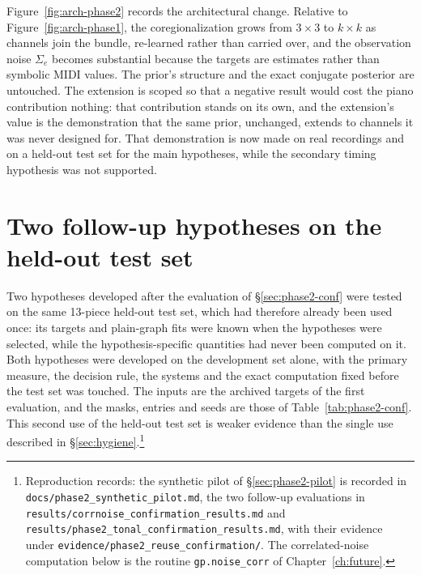 Figure~\ref{fig:arch-phase2} records the architectural change. Relative
to Figure~\ref{fig:arch-phase1}, the coregionalization grows from
$3 \times 3$ to $k \times k$ as channels join the bundle, re-learned
rather than carried over, and the observation noise $\Sigma_e$ becomes
substantial because the targets are estimates rather than symbolic MIDI
values. The prior's structure and the exact conjugate posterior are
untouched. The extension is scoped so that a negative result would cost
the piano contribution nothing: that contribution stands on its own, and
the extension's value is the demonstration that the same prior,
unchanged, extends to channels it was never designed for. That
demonstration is now made on real recordings and on a held-out test set
for the main hypotheses, while the secondary timing hypothesis was not
supported.


\section{Two follow-up hypotheses on the held-out test set}
\label{sec:phase2-reuse}
Two hypotheses developed after the evaluation of \S\ref{sec:phase2-conf}
were tested on the same 13-piece held-out test set, which had therefore
already been used once: its targets and plain-graph fits were known when
the hypotheses were selected, while the hypothesis-specific quantities
had never been computed on it. Both hypotheses were developed on the
development set alone, with the primary measure, the decision rule, the
systems and the exact computation fixed before the test set was touched.
The inputs are the archived targets of the first evaluation, and the
masks, entries and seeds are those of Table~\ref{tab:phase2-conf}. This
second use of the held-out test set is weaker evidence than the single
use described in \S\ref{sec:hygiene}.\footnote{Reproduction records: the synthetic pilot of
\S\ref{sec:phase2-pilot} is recorded in
\texttt{docs/phase2\_synthetic\_pilot.md}, the two follow-up evaluations
in \texttt{results/corrnoise\_confirmation\_results.md} and
\texttt{results/phase2\_tonal\_confirmation\_results.md}, with their
evidence under \texttt{evidence/phase2\_reuse\_confirmation/}. The
correlated-noise computation below is the routine
\texttt{gp.noise\_corr} of Chapter~\ref{ch:future}.}

